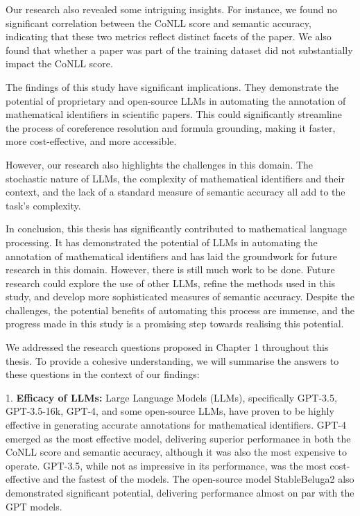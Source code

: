 Our research also revealed some intriguing insights. For instance, we found no significant correlation between the CoNLL score and semantic accuracy, indicating that these two metrics reflect distinct facets of the paper. We also found that whether a paper was part of the training dataset did not substantially impact the CoNLL score.

The findings of this study have significant implications. They demonstrate the potential of proprietary and open-source LLMs in automating the annotation of mathematical identifiers in scientific papers. This could significantly streamline the process of coreference resolution and formula grounding, making it faster, more cost-effective, and more accessible. 

However, our research also highlights the challenges in this domain. The stochastic nature of LLMs, the complexity of mathematical identifiers and their context, and the lack of a standard measure of semantic accuracy all add to the task's complexity. 

In conclusion, this thesis has significantly contributed to mathematical language processing. It has demonstrated the potential of LLMs in automating the annotation of mathematical identifiers and has laid the groundwork for future research in this domain. However, there is still much work to be done. Future research could explore the use of other LLMs, refine the methods used in this study, and develop more sophisticated measures of semantic accuracy. Despite the challenges, the potential benefits of automating this process are immense, and the progress made in this study is a promising step towards realising this potential.

We addressed the research questions proposed in Chapter 1 throughout this thesis. To provide a cohesive understanding, we will summarise the answers to these questions in the context of our findings:

1. \textbf{Efficacy of LLMs:} Large Language Models (LLMs), specifically GPT-3.5, GPT-3.5-16k, GPT-4, and some open-source LLMs, have proven to be highly effective in generating accurate annotations for mathematical identifiers. GPT-4 emerged as the most effective model, delivering superior performance in both the CoNLL score and semantic accuracy, although it was also the most expensive to operate. GPT-3.5, while not as impressive in its performance, was the most cost-effective and the fastest of the models. The open-source model StableBeluga2 also demonstrated significant potential, delivering performance almost on par with the GPT models.


